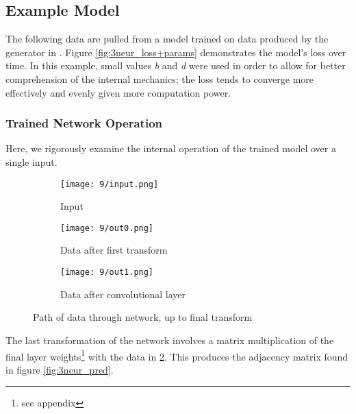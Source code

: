 \subsection{Example Model}
\label{subsec:3neurex}
The following data are pulled from a model trained on data produced by the 
generator in . Figure 
\ref{fig:3neur_loss+params} demonstrates the model's loss over time. In this 
example, small values \textit{b} and \textit{d} were used in order to allow for 
better comprehension of the internal mechanics; the loss tends to converge more 
effectively and evenly given more computation power.


\subsubsection{Trained Network Operation}
Here, we rigorously examine the internal operation of the trained model over a 
single input.
\begin{figure}[h]
	\centering
	\begin{subfigure}{.15\textwidth}
		\centering
		\texttt{[image: 9/input.png]}
		\caption{Input}
		\label{subfig:3neur_in}
	\end{subfigure}
	\hspace{1em}
	\begin{subfigure}{.3\textwidth}
		\texttt{[image: 9/out0.png]}
		\caption{Data after first transform}
	\end{subfigure}
	\hspace{1em}
	\begin{subfigure}{.3\textwidth}
		\texttt{[image: 9/out1.png]}
		\caption{Data after convolutional layer}
		\label{subfig:3neur_out1}
	\end{subfigure}
	\caption{Path of data through network, up to final transform}
	\label{fig:3neur_input}
\end{figure}

The last transformation of the network involves a matrix multiplication of the 
final layer weights\footnote{see appendix} with the data in 
\ref{subfig:3neur_out1}. This produces the adjacency matrix found in figure 
\ref{fig:3neur_pred}.

\begin{table}[h]
	\centering
	\label{fig:3neur_pred}
\end{table}

